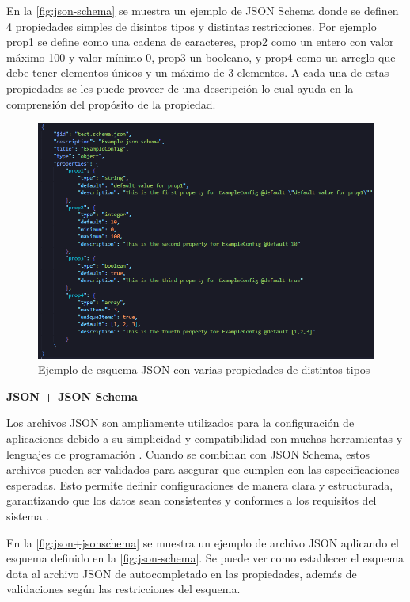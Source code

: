 En la \autoref{fig:json-schema} se muestra un ejemplo de JSON Schema donde se definen 4 propiedades simples de disintos tipos y distintas restricciones. Por ejemplo prop1 se define como una cadena de caracteres, prop2 como un entero con valor máximo 100 y valor mínimo 0, prop3 un booleano, y prop4 como un arreglo que debe tener elementos únicos y un máximo de 3 elementos. A cada una de estas propiedades se les puede proveer de una descripción lo cual ayuda en la comprensión del propósito de la propiedad.

\begin{figure}[H]
    \centering
    \includegraphics[width=\linewidth]{images/json-schema.png}
    \caption{Ejemplo de esquema JSON con varias propiedades de distintos tipos}
    \label{fig:json-schema}
\end{figure}

\textbf{JSON + JSON Schema}

Los archivos JSON son ampliamente utilizados para la configuración de aplicaciones debido a su simplicidad y compatibilidad con muchas herramientas y lenguajes de programación \autocite{erickson_what_2024}. Cuando se combinan con JSON Schema, estos archivos pueden ser validados para asegurar que cumplen con las especificaciones esperadas. Esto permite definir configuraciones de manera clara y estructurada, garantizando que los datos sean consistentes y conformes a los requisitos del sistema \autocite{bray_javascript_2014,attouche_witness_2022}.

En la \autoref{fig:json+jsonschema} se muestra un ejemplo de archivo JSON aplicando el esquema definido en la \autoref{fig:json-schema}. Se puede ver como establecer el esquema dota al archivo JSON de autocompletado en las propiedades, además de validaciones según las restricciones del esquema.

